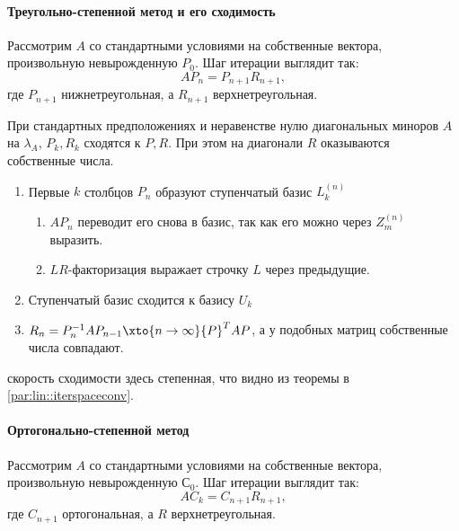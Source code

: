 \documentclass{trlnotes}
\begin{document}
\paragraph{Треугольно-степенной метод и его сходимость}
\label{par:lin::trpowermethod}

\begin{defn}\label{defn:lin::trpowermethod}
  Рассмотрим $A$ со стандартными условиями на собственные вектора, 
  произвольную невырожденную $P_0$.
  Шаг итерации выглядит так: 
  \[
    AP_{n} = P_{n+1}R_{n+1},
  \]где $P_{n+1}$ нижнетреугольная, а $R_{n+1}$ верхнетреугольная.
\end{defn}

\begin{thrm}\label{thrm:lin::trpowermethod::conv}
  При стандартных предположениях и неравенстве нулю диагональных
  миноров $A$ на $λ_A$, $P_k, R_k$ сходятся к $P, R$.
  При этом на диагонали $R$ оказываются собственные числа.
\end{thrm}

\begin{prf}
  \begin{enumerate}
    \item Первые $k$ столбцов $P_n$ образуют ступенчатый базис $L_k^{(n)}$
      \begin{enumerate}
        \item $AP_n$ переводит его снова в базис, так как его можно через $Z_{m}^{(n)}$
          выразить.
        \item $LR$-факторизация выражает строчку $L$ через предыдущие.
      \end{enumerate}
    \item Ступенчатый базис сходится к базису $U_k$
    \item $R_{n} = P_{n}^{-1}AP_{n-1} \xto{n\to\infty} {P}^T A P$, а у подобных матриц
      собственные числа совпадают.
  \end{enumerate}
\end{prf}
скорость сходимости здесь степенная, что видно из теоремы в
\ref{par:lin::iterspaceconv}.

\paragraph{Ортогонально-степенной метод}
\begin{defn}\label{defn:lin::iterspaceconv}
  Рассмотрим $A$ со стандартными условиями на собственные вектора, 
  произвольную невырожденную $С_0$.
  Шаг итерации выглядит так: 
  \[
    AC_{k} = C_{n+1}R_{n+1},
  \]где $C_{n+1}$ ортогональная, а $R$ верхнетреугольная.
\end{defn}
\end{document}
